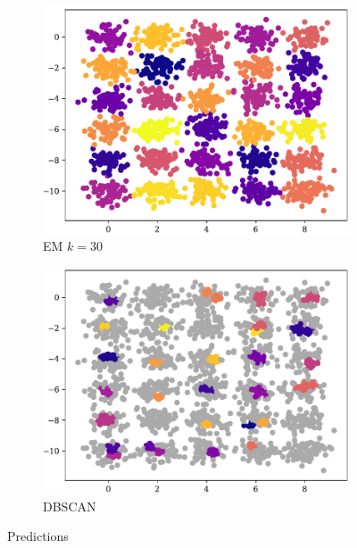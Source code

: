 \begin{figure}[t!]
\begin{subfigure}[b]{0.45\textwidth}
        \includegraphics[width=\textwidth]{../plots/30-30_pred_em.pdf}
        \caption{EM $k = 30$}
        \label{subfig:30-30-em}
    \end{subfigure}
    \hspace{0.09\textwidth}
    \begin{subfigure}[b]{0.45\textwidth}
        \includegraphics[width=\textwidth]{../plots/30-30_pred_dbscan.pdf}
        \caption{DBSCAN}
        \label{subfig:30-30-dbscan}
    \end{subfigure}
    \caption{Predictions}
    \label{fig:pred1}
\end{figure}
